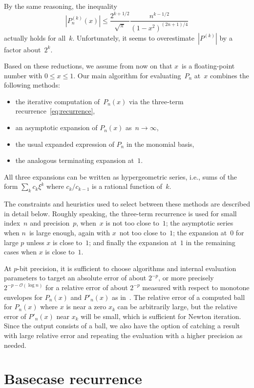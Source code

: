 \documentclass[nohypdvips,review]{siamart0216}
\newcommand{\OO}{\mathcal{O}}
\begin{document}
\begin{remark}
By the same reasoning, the inequality
\[ |P^{(k)}_n(x)| \leq \frac{2^{k+1/2}}{\sqrt{\pi}}
                       \frac{n^{k-1/2}}{(1 - x^2)^{(2n+1)/4}} \]
actually holds for all~$k$. Unfortunately, it seems to
overestimate~$|P^{(k)}|$ by a factor about~$2^k$.
\end{remark}

Based on these reductions, we assume from now on that $x$~is a
floating-point number with $0 \leq x \leq 1$.
Our main algorithm for evaluating~$P_n$ at~$x$ combines the following
methods:
\begin{itemize}
  \item the iterative computation of~$P_n(x)$
  via the three-term recurrence~\cref{eq:recurrence},
  \item an asymptotic expansion of $P_n(x)$ as~$n \to \infty$,
  \item the usual expanded expression of $P_n$ in the monomial basis,
  \item the analogous terminating expansion at~$1$.
\end{itemize}
All three expansions can be written as hypergeometric
series, i.e., sums of the form $\sum_k c_k \xi^k$ where $c_k/c_{k-1}$
is a rational function of~$k$.

The constraints and heuristics used to select between these methods
are described in detail below.
Roughly speaking,
the three-term recurrence is used for small index~$n$ and precision~$p$, when~$x$
is not too close to~$1$;
the asymptotic series when $n$~is large enough, again with $x$~not too
close to~$1$;
the expansion at~$0$ for large $p$ unless $x$ is close to~$1$;
and finally the expansion at~$1$ in the remaining cases
when $x$ is close to~$1$.

At $p$-bit precision, it is sufficient to choose algorithms
and internal evaluation parameters to target
an absolute error of about $2^{-p}$, or more precisely $2^{-p-\OO(\log n)}$
for a relative error of about $2^{-p}$ measured with respect
to monotone envelopes for $P_n(x)$ and $P'_n(x)$ as in~\cite{Bogaert2012}.
The relative error of a computed ball for $P_n(x)$ where $x$ is near a zero $x_k$
can be arbitrarily large, but the relative error of $P'_n(x)$ near $x_k$
will be small, which is sufficient for Newton iteration.
Since the output consists of a ball, we also have the option of catching
a result with large relative error and repeating the evaluation with a
higher precision as needed.

\section{Basecase recurrence}
\end{document}
